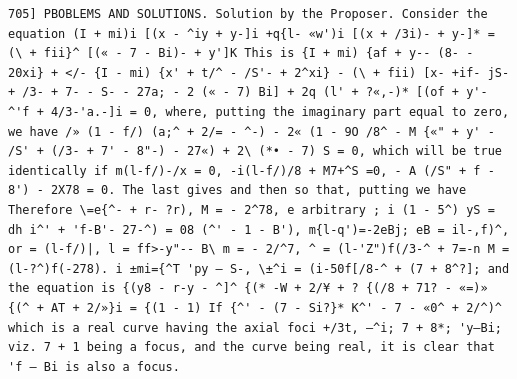 \documentclass[12pt]{article}
\theoremstyle{plain}
\begin{document}
\newpage
\setcounter{page}{597}
\begin{verbatim}
705] PBOBLEMS AND SOLUTIONS. Solution by the Proposer. Consider the equation (I + mi)i [(x - ^iy + y-]i +q{l- «w')i [(x + /3i)- + y-]* = (\ + fii}^ [(« - 7 - Bi)- + y']K This is {I + mi) {af + y-- (8- - 20xi} + </- {I - mi) {x' + t/^ - /S'- + 2^xi} - (\ + fii) [x- +if- jS- + /3- + 7- - S- - 27a; - 2 (« - 7) Bi] + 2q (l' + ?«,-)* [(of + y'- ^'f + 4/3-'a.-]i = 0, where, putting the imaginary part equal to zero, we have /» (1 - f/) (a;^ + 2/= - ^-) - 2« (1 - 9O /8^ - M {«" + y' - /S' + (/3- + 7' - 8"-) - 27«) + 2\ (*• - 7) S = 0, which will be true identically if m(l-f/)-/x = 0, -i(l-f/)/8 + M7+^S =0, - A (/S" + f - 8') - 2X78 = 0. The last gives and then so that, putting we have Therefore \=e{^- + r- ?r), M = - 2^78, e arbitrary ; i (1 - 5^) yS = dh i^' + 'f-B'- 27-^) = 08 (^' - 1 - B'), m{l-q')=-2eBj; eB = il-,f)^, or = (l-f/)|, l = ff>-y"-- B\ m = - 2/^7, ^ = (l-'Z")f(/3-^ + 7=-n M = (l-?^)f(-278). i ±mi={^T 'py — S-, \±^i = (i-50f[/8-^ + (7 + 8^?]; and the equation is {(y8 - r-y - ^]^ {(* -W + 2/¥ + ? {(/8 + 71? - «=)» {(^ + AT + 2/»}i = {(1 - 1) If {^' - (7 - Si?}* K^' - 7 - «0^ + 2/^)^ which is a real curve having the axial foci +/3t, —^i; 7 + 8*; 'y—Bi; viz. 7 + 1 being a focus, and the curve being real, it is clear that 'f — Bi is also a focus. 
\end{verbatim}
\end{document}
